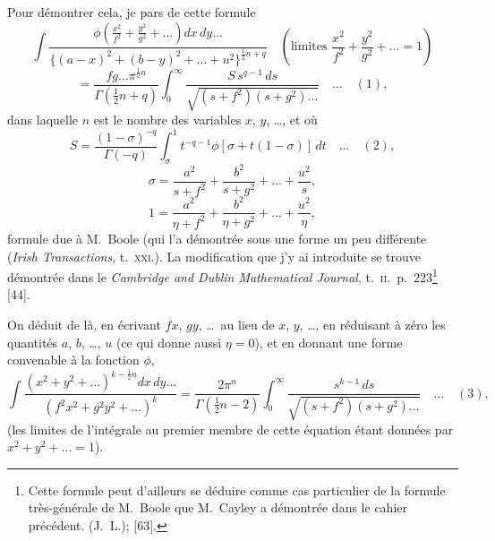 \documentclass[11pt]{article}
\begin{document}
\medskip
Pour d\'emontrer cela, je pars de cette formule
\[
\int\frac{\phi\!\left(\frac{x^{2}}{f^{2}} + \frac{y^{2}}{g^{2}} + \ldots\right)dx\,dy\ldots}{\{(a - x)^{2} + (b - y)^{2} + \ldots + u^{2}\}^{\frac{1}{2}n + q}}\quad\left(\text{limites } \frac{x^{2}}{f^{2}} + \frac{y^{2}}{g^{2}} + \ldots = 1\right)
\]
\[
= \frac{fg\ldots\pi^{\frac{1}{2}n}}{\Gamma(\tfrac{1}{2}n + q)}\int_{0}^{\infty}\frac{S\,s^{q - 1}\,ds}{\sqrt{(s + f^{2})(s + g^{2})\ldots}}\quad\ldots\quad (1),
\]
dans laquelle $n$ est le nombre des variables $x$, $y$, \ldots, et o\`u
\[
S = \frac{(1 - \sigma)^{-q}}{\Gamma(-q)}\int_{\sigma}^{1}t^{-q - 1}\phi[\sigma + t(1 - \sigma)]\,dt\quad\ldots\quad (2),
\]
\[
\sigma = \frac{a^{2}}{s + f^{2}} + \frac{b^{2}}{s + g^{2}} + \ldots + \frac{u^{2}}{s},
\]
\[
1 = \frac{a^{2}}{\eta + f^{2}} + \frac{b^{2}}{\eta + g^{2}} + \ldots + \frac{u^{2}}{\eta},
\]
formule due \`a M.~Boole (qui l'a d\'emontr\'ee sous une forme un peu diff\'erente (\textit{Irish
Transactions}, t.~\textsc{xxi}.). La modification que j'y ai introduite se trouve d\'emontr\'ee dans
le \textit{Cambridge and Dublin Mathematical Journal}, t.~\textsc{ii}.\ p.~223\footnote{Cette formule peut d'ailleurs se d\'eduire comme cas particulier de la formule tr\`es-g\'en\'erale de M.~Boole que M.~Cayley a d\'emontr\'ee dans le cahier pr\'ec\'edent. (J.~L.); [63].} [44].


On d\'eduit de l\`a, en \'ecrivant $fx$, $gy$, \ldots\ au lieu de $x$, $y$, \ldots, en r\'eduisant \`a z\'ero les
quantit\'es $a$, $b$, \ldots, $u$ (ce qui donne aussi $\eta = 0$), et en donnant une forme convenable \`a
la fonction $\phi$,
\[
\int\frac{(x^{2} + y^{2} + \ldots)^{k - \tfrac{1}{2}n}dx\,dy\ldots}{(f^{2}x^{2} + g^{2}y^{2} + \ldots)^{k}} = \frac{2\pi^{n}}{\Gamma(\tfrac{1}{2}n - 2)}\int_{0}^{\infty}\frac{s^{k - 1}\,ds}{\sqrt{(s + f^{2})(s + g^{2})\ldots}}\quad\ldots\quad (3),
\]
(les limites de l'int\'egrale au premier membre de cette \'equation \'etant donn\'ees par
$x^{2} + y^{2} + \ldots = 1$).
\end{document}
